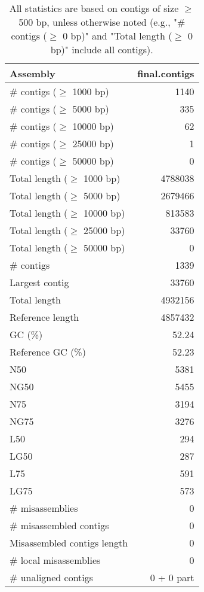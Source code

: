 \documentclass[12pt,a4paper]{article}
\begin{document}
\begin{table}[ht]
\begin{center}
\caption{All statistics are based on contigs of size $\geq$ 500 bp, unless otherwise noted (e.g., "\# contigs ($\geq$ 0 bp)" and "Total length ($\geq$ 0 bp)" include all contigs).}
\begin{tabular}{|l*{1}{|r}|}
\hline
Assembly & final.contigs \\ \hline
\# contigs ($\geq$ 1000 bp) & 1140 \\ \hline
\# contigs ($\geq$ 5000 bp) & 335 \\ \hline
\# contigs ($\geq$ 10000 bp) & 62 \\ \hline
\# contigs ($\geq$ 25000 bp) & 1 \\ \hline
\# contigs ($\geq$ 50000 bp) & 0 \\ \hline
Total length ($\geq$ 1000 bp) & 4788038 \\ \hline
Total length ($\geq$ 5000 bp) & 2679466 \\ \hline
Total length ($\geq$ 10000 bp) & 813583 \\ \hline
Total length ($\geq$ 25000 bp) & 33760 \\ \hline
Total length ($\geq$ 50000 bp) & 0 \\ \hline
\# contigs & 1339 \\ \hline
Largest contig & 33760 \\ \hline
Total length & 4932156 \\ \hline
Reference length & 4857432 \\ \hline
GC (\%) & 52.24 \\ \hline
Reference GC (\%) & 52.23 \\ \hline
N50 & 5381 \\ \hline
NG50 & 5455 \\ \hline
N75 & 3194 \\ \hline
NG75 & 3276 \\ \hline
L50 & 294 \\ \hline
LG50 & 287 \\ \hline
L75 & 591 \\ \hline
LG75 & 573 \\ \hline
\# misassemblies & 0 \\ \hline
\# misassembled contigs & 0 \\ \hline
Misassembled contigs length & 0 \\ \hline
\# local misassemblies & 0 \\ \hline
\# unaligned contigs & 0 + 0 part \\ \hline

\end{tabular}
\end{center}
\end{table}
\end{document}
